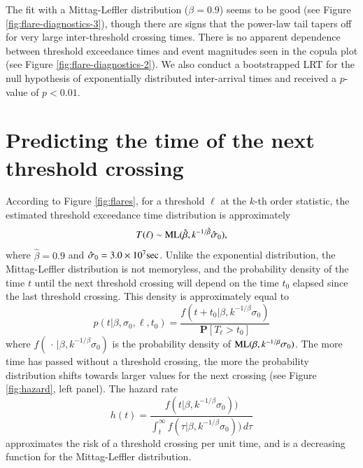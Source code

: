 \documentclass[]{elsarticle} %
\begin{document}
The fit with a Mittag-Leffler distribution (\(\beta = 0.9\)) seems to be
good (see Figure \ref{fig:flare-diagnostics-3}), though there are signs
that the power-law tail tapers off for very large inter-threshold
crossing times. There is no apparent dependence between threshold
exceedance times and event magnitudes seen in the copula plot (see
Figure \ref{fig:flare-diagnostics-2}). We also conduct a bootstrapped
LRT for the null hypothesis of exponentially distributed inter-arrival
times and received a \(p\)-value of \(p<0.01\).

\hypertarget{predicting-the-time-of-the-next-threshold-crossing}{%
\section{Predicting the time of the next threshold
crossing}\label{predicting-the-time-of-the-next-threshold-crossing}}

According to Figure \ref{fig:flares}, for a threshold \(\ell\) at the
\(k\)-th order statistic, the estimated threshold exceedance time
distribution is approximately \[
T(\ell) \sim {\rm ML}(\hat{\beta}, k^{-1/\hat{\beta}} \hat{\sigma}_0), 
\] where \(\hat{\beta} = 0.9\) and
\(\hat{\sigma}_0 = 3.0 \times 10^7 {\rm sec}\). Unlike the exponential
distribution, the Mittag-Leffler distribution is not memoryless, and the
probability density of the time \(t\) until the next threshold crossing
will depend on the time \(t_0\) elapsed since the last threshold
crossing. This density is approximately equal to \[
p(t|\beta, \sigma_0, \ell, t_0) = \frac{f(t + t_0 | \beta, k^{-1/\beta} \sigma_0)}{\mathbf P[T_\ell > t_0]}
\] where \(f(\,\cdot\, | \beta, k^{-1/\beta} \sigma_0)\) is the
probability density of \({\rm ML}(\beta, k^{-1/\beta} \sigma_0)\). The
more time has passed without a threshold crossing, the more the
probability distribution shifts towards larger values for the next
crossing (see Figure \ref{fig:hazard}, left panel). The hazard rate \[
h(t) = \frac{f(t| \beta, k^{-1/\beta} \sigma_0))}{\int_t^\infty f(\tau| \beta, k^{-1/\beta} \sigma_0))\,d\tau}
\] approximates the risk of a threshold crossing per unit time, and is a
decreasing function for the Mittag-Leffler distribution.
\end{document}
